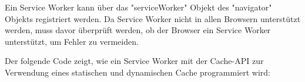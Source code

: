 
Ein Service Worker kann über das "serviceWorker" Objekt des "navigator" Objekts registriert werden. Da Service Worker nicht in allen Browsern unterstützt werden, muss davor überprüft werden, ob der Browser ein Service Worker unterstützt, um Fehler zu vermeiden.

\pagebreak
{}
Der folgende Code zeigt, wie ein Service Worker mit der Cache-API zur Verwendung eines statischen und dynamischen Cache programmiert wird:


